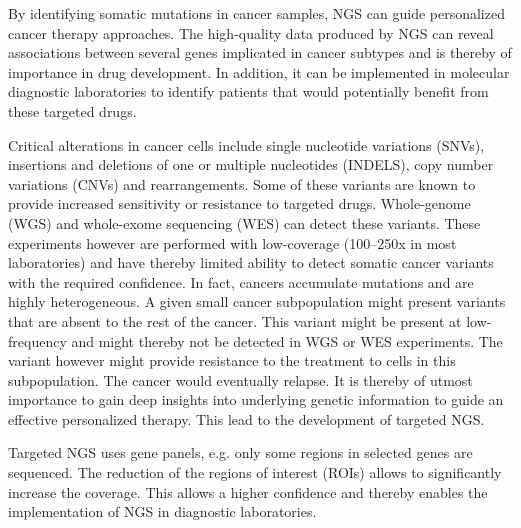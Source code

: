 By identifying somatic mutations in cancer samples, NGS can guide personalized
cancer therapy approaches. The high-quality data produced by NGS can reveal
associations between several genes implicated in cancer subtypes and is thereby
of importance in drug development. In addition, it can be implemented in molecular
diagnostic laboratories to identify patients that would potentially benefit from
these targeted drugs.

Critical alterations in cancer cells include single nucleotide variations (SNVs),
insertions and deletions of one or multiple nucleotides (INDELS), copy number
variations (CNVs) and rearrangements. Some of these variants are known to
provide increased sensitivity or resistance to targeted drugs. Whole-genome
(WGS) and whole-exome sequencing (WES) can detect these variants. These
experiments however are performed with low-coverage (100--250x in most
laboratories) and have thereby limited ability to detect somatic cancer variants
with the required confidence. In fact, cancers accumulate mutations and are
highly heterogeneous. A given small cancer subpopulation might present variants that
are absent to the rest of the cancer. This variant might be present at
low-frequency and might thereby not be detected in WGS or WES experiments. The
variant however might provide resistance to the treatment to cells in this
subpopulation. The cancer would eventually relapse. It is thereby of utmost
importance to gain deep insights into underlying genetic information to guide an
effective personalized therapy. This lead to the development of targeted NGS.

Targeted NGS uses gene panels, e.g. only some regions in selected genes are
sequenced. The reduction of the regions of interest (ROIs) allows to significantly
increase the coverage. This allows a higher confidence and thereby enables
the implementation of NGS in diagnostic laboratories.

